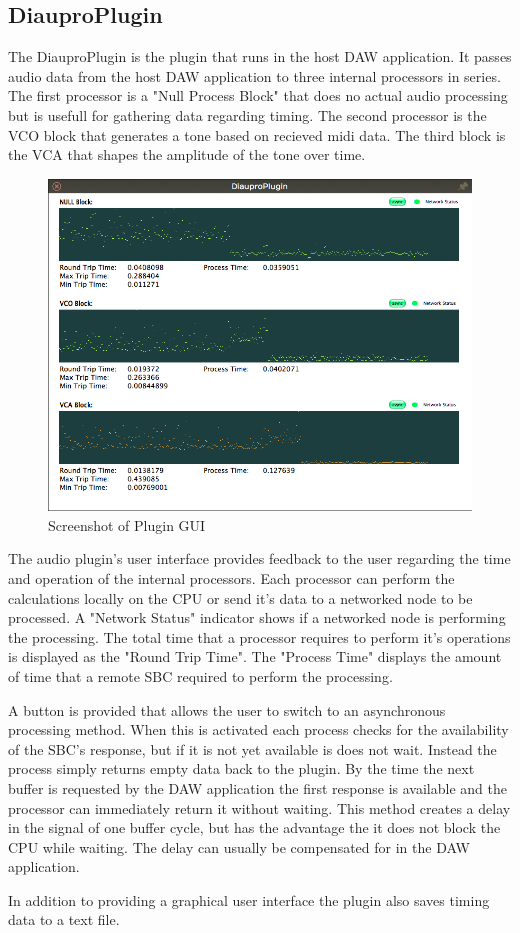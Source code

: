\subsection{DiauproPlugin}

The DiauproPlugin is the plugin that runs in the host DAW application. It passes audio data from the host DAW application to three internal processors in series. The first processor is a "Null Process Block" that does no actual audio processing but is usefull for gathering data regarding timing. The second processor is the VCO block that generates a tone based on recieved midi data. The third block is the VCA that shapes the amplitude of the tone over time.

\begin{figure}[H]
    \centering
    \includegraphics[width=\textwidth]{assets/plugin.png}
    \caption{Screenshot of Plugin GUI}
    \label{fig:plugin}
\end{figure}

The audio plugin's user interface provides feedback to the user regarding the time and operation of the internal processors. Each processor can perform the calculations locally on the CPU or send it's data to a networked node to be processed. A "Network Status" indicator shows if a networked node is performing the processing. The total time that a processor requires to perform it's operations is displayed as the "Round Trip Time". The "Process Time" displays the amount of time that a remote SBC required to perform the processing.

A button is provided that allows the user to switch to an asynchronous processing method. When this is activated each process checks for the availability of the SBC's response, but if it is not yet available is does not wait. Instead the process simply returns empty data back to the plugin. By the time the next buffer is requested by the DAW application the first response is available and the processor can immediately return it without waiting. This method creates a delay in the signal of one buffer cycle, but has the advantage the it does not block the CPU while waiting. The delay can usually be compensated for in the DAW application.

In addition to providing a graphical user interface the plugin also saves timing data to a text file.